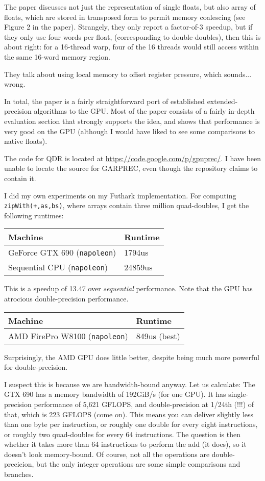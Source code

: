 \documentclass[a4paper, oneside, final]{memoir}
\begin{document}
The paper discusses not just the representation of single floats, but
also array of floats, which are stored in transposed form to permit
memory coalescing (see Figure 2 in the paper).  Strangely, they only
report a factor-of-3 speedup, but if they only use four words per
float, (corresponding to double-doubles), then this is about right:
for a 16-thread warp, four of the 16 threads would still access within
the same 16-word memory region.

They talk about using local memory to offset register pressure, which
sounds... wrong.

In total, the paper is a fairly straightforward port of established
extended-precision algorithms to the GPU.  Most of the paper consists
of a fairly in-depth evaluation section that strongly supports the
idea, and shows that performance is very good on the GPU (although I
would have liked to see some comparisons to native floats).

The code for QDR is located at
\url{https://code.google.com/p/gpuprec/}.  I have been unable to
locate the source for GARPREC, even though the repository claims to
contain it.

I did my own experiments on my Futhark implementation.  For computing
\texttt{zipWith(+,as,bs)}, where arrays contain three million
quad-doubles, I get the following runtimes:

\begin{tabular}{l|l}
  \hline
  \textbf{Machine} & \textbf{Runtime} \\\hline
  GeForce GTX 690 (\texttt{napoleon}) & 1794us \\
  Sequential CPU (\texttt{napoleon}) & 24859us \\
\end{tabular}

This is a speedup of 13.47 over \textit{sequential} performance.  Note
that the GPU has atrocious double-precision performance.

\begin{tabular}{l|l}
  \hline
  Machine & Runtime \\\hline
  AMD FirePro W8100 (\texttt{napoleon}) & 849us (best)
\end{tabular}

Surprisingly, the AMD GPU does little better, despite being much more
powerful for double-precision.

I suspect this is because we are bandwidth-bound anyway.  Let us
calculate: The GTX 690 has a memory bandwidth of 192GiB/s (for one
GPU).  It has single-precision performance of 5,621 GFLOPS, and
double-precision at 1/24th (!!!) of that, which is 223 GFLOPS (come
on).  This means you can deliver slightly less than one byte per
instruction, or roughly one double for every eight instructions, or
roughly two quad-doubles for every 64 instructions.  The question is
then whether it takes more than 64 instructions to perform the add (it
does), so it doesn't look memory-bound.  Of course, not all the
operations are double-precicion, but the only integer operations are
some simple comparisons and branches.
\end{document}
